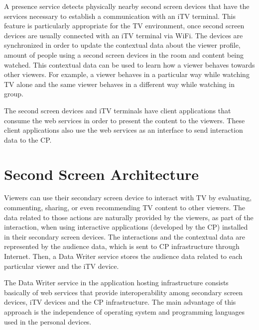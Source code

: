 \documentclass[journal]{IEEEtran}
\begin{document}
A presence service detects physically nearby second screen devices that have the services necessary to establish a communication with an iTV terminal. This feature is particularly appropriate for the TV environment, once second screen devices are usually connected with an iTV terminal via WiFi. The devices are synchronized in order to update the contextual data about the viewer profile, amount of people using a second screen devices in the room and content being watched. This contextual data can be used to learn how a viewer behaves towards other viewers. For example, a viewer behaves in a particular way while watching TV alone and the same viewer behaves in a different way while watching in group.

The second screen devices and iTV terminals have client applications that consume the web services in order to present the content to the viewers. These client applications also use the web services as an interface to send interaction data to the CP. 




\section{Second Screen Architecture}


Viewers can use their secondary screen device to interact with TV by evaluating, commenting, sharing, or even recommending TV content to other viewers. The data related to those actions are naturally provided by the viewers, as part of the interaction, when using interactive applications (developed by the CP) installed in their secondary screen devices. The interactions and the contextual data are represented by the audience data, which is sent to CP infrastructure through Internet. Then, a Data Writer service stores the audience data related to each particular viewer and the iTV device.

The Data Writer service in the application hosting infrastructure consists basically of web services that provide interoperability among secondary screen devices, iTV devices and the CP infrastructure. The main advantage of this approach is the independence of operating system and programming languages used in the personal devices.
 
\end{document}
